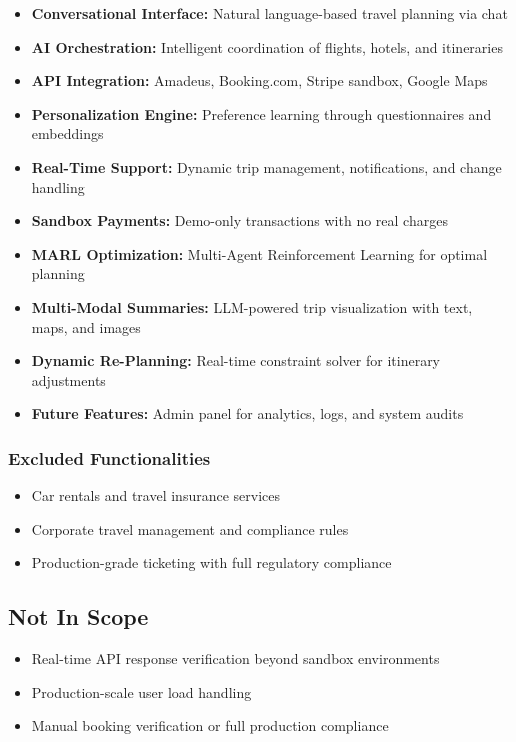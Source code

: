 \documentclass[12pt,a4paper]{article}
\begin{document}
\begin{itemize}[leftmargin=*, itemsep=0.3em]
    \item \textbf{Conversational Interface:} Natural language-based travel planning via chat
    \item \textbf{AI Orchestration:} Intelligent coordination of flights, hotels, and itineraries
    \item \textbf{API Integration:} Amadeus, Booking.com, Stripe sandbox, Google Maps
    \item \textbf{Personalization Engine:} Preference learning through questionnaires and embeddings
    \item \textbf{Real-Time Support:} Dynamic trip management, notifications, and change handling
    \item \textbf{Sandbox Payments:} Demo-only transactions with no real charges
    \item \textbf{MARL Optimization:} Multi-Agent Reinforcement Learning for optimal planning
    \item \textbf{Multi-Modal Summaries:} LLM-powered trip visualization with text, maps, and images
    \item \textbf{Dynamic Re-Planning:} Real-time constraint solver for itinerary adjustments
    \item \textbf{Future Features:} Admin panel for analytics, logs, and system audits
\end{itemize}

\subsubsection{Excluded Functionalities}

\begin{itemize}[leftmargin=*, itemsep=0.3em]
    \item Car rentals and travel insurance services
    \item Corporate travel management and compliance rules
    \item Production-grade ticketing with full regulatory compliance
\end{itemize}

\subsection{Not In Scope}

\begin{itemize}[leftmargin=*, itemsep=0.3em]
    \item Real-time API response verification beyond sandbox environments
    \item Production-scale user load handling
    \item Manual booking verification or full production compliance
\end{itemize}
\end{document}
